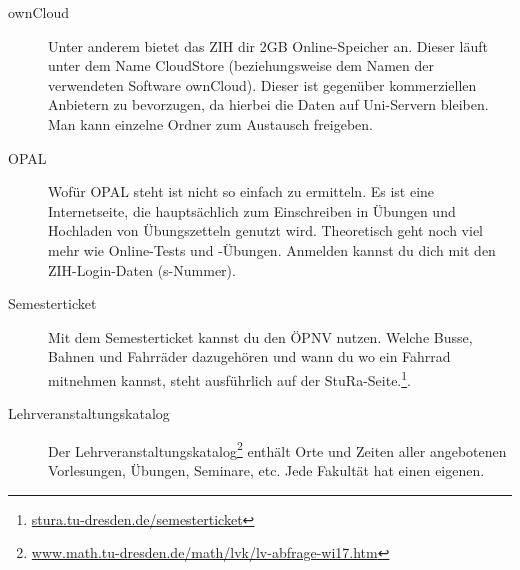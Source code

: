 \documentclass{scrartcl}
\begin{document}
\begin{description}
  \item[ownCloud] Unter anderem bietet das ZIH dir 2GB Online-Speicher an.
    Dieser läuft unter dem Name CloudStore (beziehungsweise dem Namen der verwendeten Software ownCloud).
    Dieser ist gegenüber kommerziellen Anbietern zu bevorzugen,
    da hierbei die Daten auf Uni-Servern bleiben. Man kann einzelne Ordner zum Austausch freigeben.
  \item[OPAL] Wofür OPAL steht ist nicht so einfach zu ermitteln. Es ist eine Internetseite, die hauptsächlich
    zum Einschreiben in Übungen und Hochladen von Übungszetteln genutzt wird. Theoretisch geht noch viel mehr
    wie Online-Tests und -Übungen.
    Anmelden kannst du dich mit den ZIH-Login-Daten (s-Nummer).
  \item[Semesterticket] Mit dem Semesterticket kannst du den ÖPNV nutzen. Welche Busse, Bahnen und Fahrräder dazugehören und wann du wo ein Fahrrad mitnehmen kannst,
    steht ausführlich auf der StuRa-Seite.\footnote{\url{stura.tu-dresden.de/semesterticket}}.
  \item[Lehrveranstaltungskatalog] Der Lehrveranstaltungskatalog\footnote{\url{www.math.tu-dresden.de/math/lvk/lv-abfrage-wi17.htm}} enthält Orte und Zeiten aller angebotenen
    Vorlesungen, Übungen, Seminare, etc. Jede Fakultät hat einen eigenen.
  
\end{description}
\end{document}
